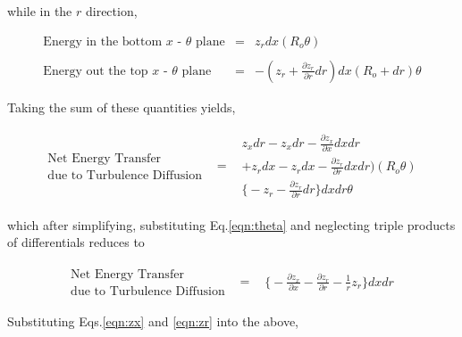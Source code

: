 	while in the $r$ direction,

\begin{displaymath}
	\begin{array}{ccc}
		\textrm{Energy in the bottom $x$ - $\theta$ plane} & = & z_rdx(R_o \theta) 
		\\ & & \\
		\textrm{Energy out the top $x$ - $\theta$ plane} & = & -(z_r + 
		\frac{\partial z_r}{\partial r}dr)dx(R_o + dr) \theta
	\end{array}
\end{displaymath}

	Taking the sum of these quantities yields,

\begin{displaymath}
	\begin{array}{ccc}
		\begin{array}{c}
		\textrm{Net Energy Transfer} \\ \textrm{due to Turbulence Diffusion}
		\end{array} & = &
			\begin{array}{c}
		z_xdr - z_xdr - \frac{\partial z_x}{\partial x}dxdr \\
		+  z_rdx - z_rdx - \frac{\partial z_r}{\partial r}dxdr)(R_o \theta)
		\\
		\Big\{-z_r - \frac{\partial z_r}{\partial r}dr\Big\}dxdr \theta
			\end{array}
	\end{array}
\end{displaymath}

	which after simplifying, substituting Eq.\ref{eqn:theta} and neglecting triple products of differentials reduces to

\begin{displaymath}
	\begin{array}{ccc}
	\begin{array}{c}
	\textrm{Net Energy Transfer} \\ \textrm{due to Turbulence Diffusion}
	\end{array} & = &
		\begin{array}{c}
			\Big\{-\frac{\partial z_x}{\partial x} - \frac{\partial z_r}{\partial r}
			- \frac{1}{r} z_r\Big\}dxdr
		\end{array}
	\end{array}
\end{displaymath}

	Substituting Eqs.\ref{eqn:zx} and \ref{eqn:zr} into the above,

